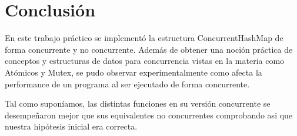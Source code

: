 \section{Conclusión}
En este trabajo práctico se implementó la estructura ConcurrentHashMap de forma concurrente y no concurrente.
Además de obtener una noción práctica de conceptos y estructuras de datos para concurrencia vistas en la materia como Atómicos y Mutex, se pudo observar experimentalmente como afecta la performance de un programa al ser ejecutado de forma concurrente.

Tal como suponíamos, las distintas funciones en su versión concurrente se desempeñaron mejor que sus equivalentes no concurrentes comprobando
asi que nuestra hipótesis inicial era correcta.

